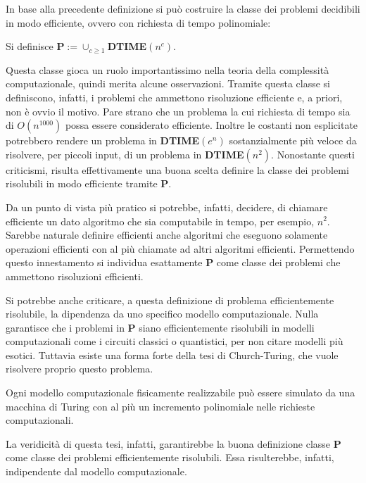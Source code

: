 In base alla precedente definizione si può costruire la classe dei problemi decidibili in modo efficiente, ovvero con richiesta di tempo polinomiale:
\begin{defn}\label{defn:P}
 Si definisce \textbf{P}$:= \cup_{c\geq 1}$\textbf{DTIME}$(n^c)$.
\end{defn}
Questa classe gioca un ruolo importantissimo nella teoria della complessità computazionale, quindi merita alcune osservazioni.
Tramite questa classe si definiscono, infatti, i problemi che ammettono risoluzione efficiente e, a priori, non è ovvio il motivo.
Pare strano che un problema la cui richiesta di tempo sia di $O(n^{1000})$ possa essere considerato efficiente.
Inoltre le costanti non esplicitate potrebbero rendere un problema in \textbf{DTIME}$(e^n)$ sostanzialmente più veloce da risolvere, per piccoli input, di un problema in \textbf{DTIME}$(n^2)$.
Nonostante questi criticismi, risulta effettivamente una buona scelta definire la classe dei problemi risolubili in modo efficiente tramite \textbf{P}.

Da un punto di vista più pratico si potrebbe, infatti, decidere, di chiamare efficiente un dato algoritmo che sia computabile in tempo, per esempio, $n^2$.
Sarebbe naturale definire efficienti anche algoritmi che eseguono solamente operazioni efficienti con al più chiamate ad altri algoritmi efficienti.
Permettendo questo innestamento si individua esattamente \textbf{P} come classe dei problemi che ammettono risoluzioni efficienti.

Si potrebbe anche criticare, a questa definizione di problema efficientemente risolubile, la dipendenza da uno specifico modello computazionale.
Nulla garantisce che i problemi in \textbf{P} siano efficientemente risolubili in modelli computazionali come i circuiti classici o quantistici, per non citare modelli più esotici.
Tuttavia esiste una forma forte della tesi di Church-Turing, che vuole risolvere proprio questo problema.
\begin{description}[align=left]
  \item [Tesi forte di Church-Turing:] Ogni modello computazionale fisicamente realizzabile può essere simulato da una macchina di Turing con al più un incremento polinomiale nelle richieste computazionali.
\end{description}
La veridicità di questa tesi, infatti, garantirebbe la buona definizione classe \textbf{P} come classe dei problemi efficientemente risolubili.
Essa risulterebbe, infatti, indipendente dal modello computazionale.

